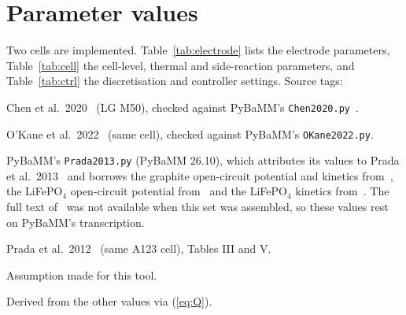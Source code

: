 \documentclass[11pt]{article}
\newcommand{\code}[1]{\texttt{#1}}
\begin{document}
\section{Parameter values}\label{sec:params}

Two cells are implemented. Table~\ref{tab:electrode} lists the electrode parameters, Table~\ref{tab:cell} the cell-level, thermal and side-reaction parameters, and Table~\ref{tab:ctrl} the discretisation and controller settings. Source tags:
\begin{description}[itemsep=1pt]
\item[C] Chen et al.\ 2020~\cite{chen2020} (LG M50), checked against PyBaMM's \code{Chen2020.py}~\cite{pybamm}.
\item[O] O'Kane et al.\ 2022~\cite{okane2022} (same cell), checked against PyBaMM's \code{OKane2022.py}.
\item[P] PyBaMM's \code{Prada2013.py} (PyBaMM 26.10), which attributes its values to Prada et al.\ 2013~\cite{prada2013} and borrows the graphite open-circuit potential and kinetics from~\cite{chen2020}, the LiFePO$_4$ open-circuit potential from~\cite{afshar2017} and the LiFePO$_4$ kinetics from~\cite{kashkooli2017}. The full text of~\cite{prada2013} was not available when this set was assembled, so these values rest on PyBaMM's transcription.
\item[P12] Prada et al.\ 2012~\cite{prada2012} (same A123 cell), Tables III and V.
\item[A] Assumption made for this tool.
\item[D] Derived from the other values via (\ref{eq:Q}).
\end{description}
\end{document}

